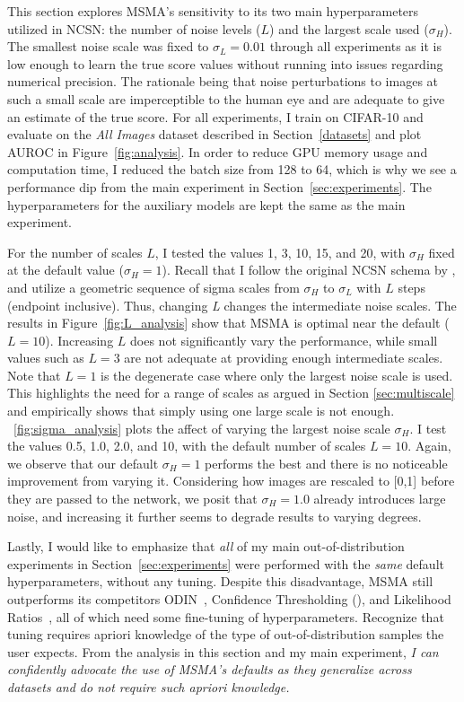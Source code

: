 This section explores MSMA's sensitivity to its two main hyperparameters utilized in NCSN: the number of noise levels ($L$) and the largest scale used ($\sigma_H$). The smallest noise scale was fixed to $\sigma_L=0.01$ through all experiments as it is low enough to learn the true score values without running into issues regarding numerical precision. The rationale being that noise perturbations to images at such a small scale are imperceptible to the human eye and are adequate to give an estimate of the true score. For all experiments, I train on CIFAR-10 and evaluate on the \emph{All Images} dataset described in Section~\ref{datasets} and plot AUROC in Figure~\ref{fig:analysis}. In order to reduce GPU memory usage and computation time, I reduced the batch size from 128 to 64, which is why we see a performance dip from the main experiment in Section~\ref{sec:experiments}. The hyperparameters for the auxiliary models are kept the same as the main experiment.

For the number of scales $L$, I tested the values 1, 3, 10, 15, and 20, with $\sigma_H$ fixed at the default value ($\sigma_H=1$). Recall that I follow the original NCSN schema by \cite{Song2019}, and utilize a geometric sequence of sigma scales from $\sigma_H$ to $\sigma_L$ with $L$ steps (endpoint inclusive). Thus, changing \emph{L} changes the intermediate noise scales. The results in Figure~\ref{fig:L_analysis} show that MSMA is optimal near the default ($L=10$). Increasing $L$ does not significantly vary the performance, while small values such as $L=3$ are not adequate at providing enough intermediate scales. Note that $L=1$ is the degenerate case where only the largest noise scale is used. This highlights the need for a range of scales as argued in Section \ref{sec:multiscale} and empirically shows that simply using one large scale is not enough. \figurename{~\ref{fig:sigma_analysis}} plots the affect of varying the largest noise scale $\sigma_H$. I test the values 0.5, 1.0, 2.0, and 10, with the default number of scales $L=10$. Again, we observe that our default $\sigma_H=1$ performs the best and there is no noticeable improvement from varying it. Considering how images are rescaled to [0,1] before they are passed to the network, we posit that $\sigma_H=1.0$ already introduces large noise, and increasing it further seems to degrade results to varying degrees. 

Lastly, I would like to emphasize that \emph{all} of my main out-of-distribution experiments in Section~\ref{sec:experiments} were performed with the \emph{same} default hyperparameters, without any tuning. Despite this disadvantage, MSMA still outperforms its competitors ODIN~\cite{Liang2017}, Confidence Thresholding (\cite{Devries}), and Likelihood Ratios~\cite{Ren2019}, all of which need some fine-tuning of hyperparameters. Recognize that tuning requires apriori knowledge of the type of out-of-distribution samples the user expects. From the analysis in this section and my main experiment, \textit{I can confidently advocate the use of MSMA's defaults as they generalize across datasets and do not require such apriori knowledge.} 


